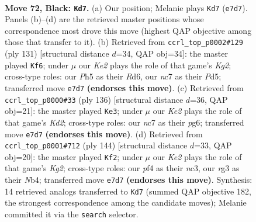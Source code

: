 \documentclass[11pt]{article}
\begin{document}
\clearpage

\begin{figure}[p]\centering
\begin{subfigure}{0.46\textwidth}\centering
\resizebox{\linewidth}{!}{%
\newchessgame
\chessboard[
  setfen={8/p1N1k1r1/P1p3p1/2P2p1p/bP3P1P/6R1/5K2/8 b - - 0 72},
  showmover=false,
  pgfstyle=straightmove, color=movearrow, markmove={e7-d7}
]}
\caption{}
\end{subfigure}\hfill
\begin{subfigure}{0.46\textwidth}\centering
\resizebox{\linewidth}{!}{%
\newchessgame
\chessboard[
  setfen={8/1R3pk1/3r4/1p1p1Pp1/4p2p/4P2P/6P1/3B3K b - - 0 66},
  showmover=false,
  pgfstyle=straightmove, color=movearrow, markmove={g7-f6}
]}
\caption{}
\end{subfigure}
\\[4pt]
\begin{subfigure}{0.46\textwidth}\centering
\resizebox{\linewidth}{!}{%
\newchessgame
\chessboard[
  setfen={8/3k1p2/6p1/1p2P1p1/pP4P1/P1R2P2/3K4/1r6 w - - 7 69},
  showmover=false,
  pgfstyle=straightmove, color=movearrow, markmove={d2-e3}
]}
\caption{}
\end{subfigure}\hfill
\begin{subfigure}{0.46\textwidth}\centering
\resizebox{\linewidth}{!}{%
\newchessgame
\chessboard[
  setfen={5k2/6p1/5p1p/3p1P1P/1N1P2P1/2n1P3/1R4K1/4r3 w - - 9 73},
  showmover=false,
  pgfstyle=straightmove, color=movearrow, markmove={g2-f2}
]}
\caption{}
\end{subfigure}
\caption{\textbf{Move 72, Black: \texttt{Kd7}.} (a) Our position; Melanie plays \texttt{Kd7} (\texttt{e7d7}). Panels (b)--(d) are the retrieved master positions whose correspondence most drove this move (highest QAP objective among those that transfer to it). (b) Retrieved from \texttt{ccrl\_top\_p0002\#129} (ply 131) [structural distance $d$=34, QAP obj=34]: the master played \texttt{Kf6}; under $\mu$ our \emph{Ke2} plays the role of that game's \emph{Kg2}; cross-type roles: our \emph{P}h5 as their \emph{R}d6, our \emph{n}c7 as their \emph{P}d5; transferred move \texttt{e7d7} \textbf{(endorses this move)}. (c) Retrieved from \texttt{ccrl\_top\_p0000\#33} (ply 136) [structural distance $d$=36, QAP obj=21]: the master played \texttt{Ke3}; under $\mu$ our \emph{Ke2} plays the role of that game's \emph{Kd2}; cross-type roles: our \emph{n}c7 as their \emph{p}g6; transferred move \texttt{e7d7} \textbf{(endorses this move)}. (d) Retrieved from \texttt{ccrl\_top\_p0001\#712} (ply 144) [structural distance $d$=33, QAP obj=20]: the master played \texttt{Kf2}; under $\mu$ our \emph{Ke2} plays the role of that game's \emph{Kg2}; cross-type roles: our \emph{p}f4 as their \emph{n}c3, our \emph{r}g3 as their \emph{N}b4; transferred move \texttt{e7d7} \textbf{(endorses this move)}. Synthesis: 14 retrieved analogs transferred to \texttt{Kd7} (summed QAP objective 182, the strongest correspondence among the candidate moves); Melanie committed it via the \texttt{search} selector.}
\label{fig:thought-m143}
\end{figure}
\end{document}
